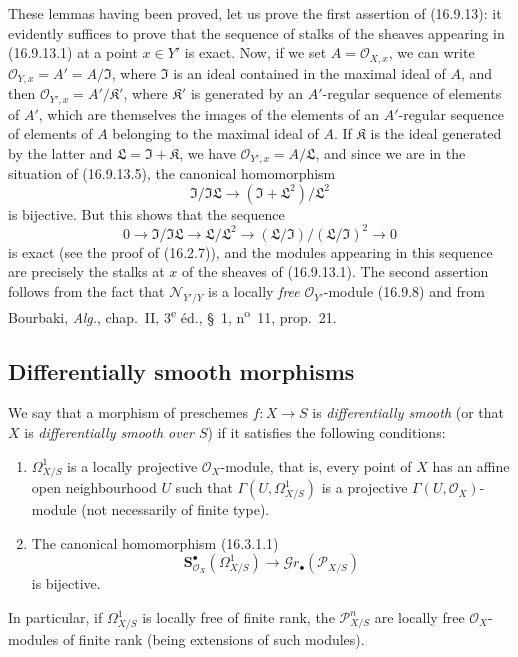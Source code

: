 These lemmas having been proved, let us prove the first assertion of
(16.9.13): it evidently suffices
to prove that the sequence of stalks of the sheaves appearing in
(16.9.13.1) at a point $x\in Y'$ is exact. Now, if we set
$A=\mathcal{O}_{X,x}$, we can write
$\mathcal{O}_{Y,x}=A'=A/\mathfrak{I}$, where $\mathfrak{I}$ is an ideal
contained in the maximal ideal of $A$, and then
$\mathcal{O}_{Y',x}=A'/\mathfrak{K}'$, where $\mathfrak{K}'$ is generated by
an $A'$-regular sequence of elements of $A'$, which are themselves the images
of the elements of an $A'$-regular sequence of elements of $A$ belonging to
the maximal ideal of $A$. If $\mathfrak{K}$ is the ideal generated by the
latter and $\mathfrak{L}=\mathfrak{I}+\mathfrak{K}$, we have
$\mathcal{O}_{Y',x}=A/\mathfrak{L}$, and since we are in the situation of
(16.9.13.5), the canonical homomorphism
\[
  \mathfrak{I}/\mathfrak{I}\mathfrak{L}
  \longrightarrow(\mathfrak{I}+\mathfrak{L}^2)/\mathfrak{L}^2
\]
is bijective. But this shows that the sequence
\[
  0\longrightarrow\mathfrak{I}/\mathfrak{I}\mathfrak{L}
  \longrightarrow\mathfrak{L}/\mathfrak{L}^2
  \longrightarrow(\mathfrak{L}/\mathfrak{I})/
    (\mathfrak{L}/\mathfrak{I})^2\longrightarrow0
\]
is exact (see the proof of (16.2.7)), and the modules appearing in this
sequence are precisely the stalks at $x$ of the sheaves of (16.9.13.1).
The second assertion follows from the fact that $\mathcal{N}_{Y'/Y}$ is a
locally \emph{free} $\mathcal{O}_{Y'}$-module (16.9.8) and from Bourbaki,
\emph{Alg.}, chap.~II, 3\textsuperscript{e} éd., §~1, n\textsuperscript{o}~11,
prop.~21.

\subsection{Differentially smooth morphisms}

\begin{definition}[16.10.1]\label{IV.16.10.1}
We say that a morphism of preschemes $f:X\to S$ is
\emph{differentially smooth} (or that $X$ is \emph{differentially
smooth over $S$}) if it satisfies the following conditions:
\begin{enumerate}
  \item[(i)] $\Omega_{X/S}^1$ is a locally projective
  $\mathcal{O}_X$-module, that is, every point of $X$ has an affine open
  neighbourhood $U$ such that $\Gamma(U,\Omega_{X/S}^1)$ is a projective
  $\Gamma(U,\mathcal{O}_X)$-module (not necessarily of finite
  type).
  \item[(ii)] The canonical homomorphism (16.3.1.1)
  \[
    \mathbf{S}_{\mathcal{O}_X}^{\bullet}(\Omega_{X/S}^1)
    \longrightarrow\mathscr{G}r_{\bullet}(\mathscr{P}_{X/S})
  \]
  is bijective.
\end{enumerate}
In particular, if $\Omega_{X/S}^1$ is locally free of finite rank, the
$\mathscr{P}_{X/S}^n$ are locally free $\mathcal{O}_X$-modules of finite
rank (being extensions of such modules).
\end{definition}

